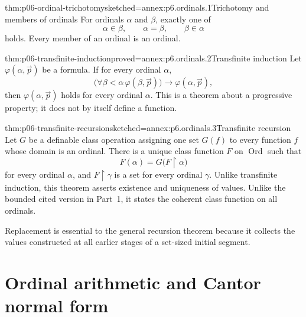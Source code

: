 \begin{hbtheorem}{thm:p06-ordinal-trichotomy}{sketched=annex:p6.ordinals.1}{Trichotomy and members of ordinals}
For ordinals \(\alpha\) and \(\beta\), exactly one of
\[
 \alpha\in\beta,
 \qquad \alpha=\beta,
 \qquad \beta\in\alpha
\]
holds.  Every member of an ordinal is an ordinal.
\end{hbtheorem}

\begin{hbtheorem}{thm:p06-transfinite-induction}{proved=annex:p6.ordinals.2}{Transfinite induction}
Let \(\varphi(\alpha,\vec p)\) be a formula.  If for every ordinal
\(\alpha\),
\[
 \bigl(\forall\beta<\alpha\,\varphi(\beta,\vec p)\bigr)
 \to\varphi(\alpha,\vec p),
\]
then \(\varphi(\alpha,\vec p)\) holds for every ordinal \(\alpha\).
This is a theorem about a progressive property; it does not by itself define a
function.
\end{hbtheorem}

\begin{hbtheorem}{thm:p06-transfinite-recursion}{sketched=annex:p6.ordinals.3}{Transfinite recursion}
Let \(G\) be a definable class operation assigning one set \(G(f)\) to every
function \(f\) whose domain is an ordinal.  There is a unique class function
\(F\) on \(\operatorname{Ord}\) such that
\[
 F(\alpha)=G\bigl(F\mathbin{\upharpoonright}\alpha\bigr)
\]
for every ordinal \(\alpha\), and
\(F\mathbin{\upharpoonright}\gamma\) is a set for every ordinal \(\gamma\).
Unlike transfinite induction, this theorem asserts existence and uniqueness of
values.  Unlike the bounded cited version in Part~1, it states the coherent
class function on all ordinals.
\end{hbtheorem}

Replacement is essential to the general recursion theorem because it collects
the values constructed at all earlier stages of a set-sized initial segment.

\section{Ordinal arithmetic and Cantor normal form}
\label{sec:p06-ordinal-arithmetic}

